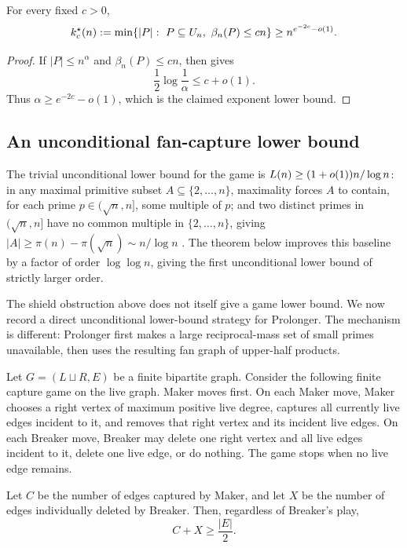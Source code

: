 \begin{corollary}\label{cor:barrier-exponent}
For every fixed $c>0$,
\[
  k_c^\star(n)
  :=
  \min\{|P|:\ P\subseteq U_n,\ \beta_n(P)\le cn\}
  \ge n^{e^{-2c}-o(1)}.
\]
\end{corollary}

\begin{proof}
If $|P|\le n^\alpha$ and $\beta_n(P)\le cn$, then
 gives
\[
  \frac12\log\frac1\alpha\le c+o(1).
\]
Thus $\alpha\ge e^{-2c}-o(1)$, which is the claimed exponent lower bound.
\end{proof}

\subsection{An unconditional fan-capture lower bound}

The trivial unconditional lower bound for the game is
$L(n)\ge(1+o(1))n/\log n$: in any maximal primitive subset
$A\subseteq\{2,\ldots,n\}$, maximality forces $A$ to contain, for each prime
$p\in(\sqrt n,n]$, some multiple of $p$; and two distinct primes in
$(\sqrt n,n]$ have no common multiple in $\{2,\ldots,n\}$, giving
$|A|\ge\pi(n)-\pi(\sqrt n)\sim n/\log n$ \cite{Forum872}.  The theorem below
improves this baseline by a factor of order $\log\log n$, giving the first
unconditional lower bound of strictly larger order.

The shield obstruction above does not itself give a game lower bound.  We now
record a direct unconditional lower-bound strategy for Prolonger.  The
mechanism is different: Prolonger first makes a large reciprocal-mass set of
small primes unavailable, then uses the resulting fan graph of upper-half
products.

\begin{lemma}\label{lem:max-degree-capture}
Let $G=(L\sqcup R,E)$ be a finite bipartite graph.  Consider the following
finite capture game on the live graph.  Maker moves first.  On each Maker move,
Maker chooses a right vertex of maximum positive live degree, captures all
currently live edges incident to it, and removes that right vertex and its
incident live edges.  On each Breaker move, Breaker may delete one right vertex
and all live edges incident to it, delete one live edge, or do nothing.  The
game stops when no live edge remains.

Let $C$ be the number of edges captured by Maker, and let $X$ be the number of
edges individually deleted by Breaker.  Then, regardless of Breaker's play,
\[
  C+X\ge \frac{|E|}{2}.
\]
\end{lemma}

